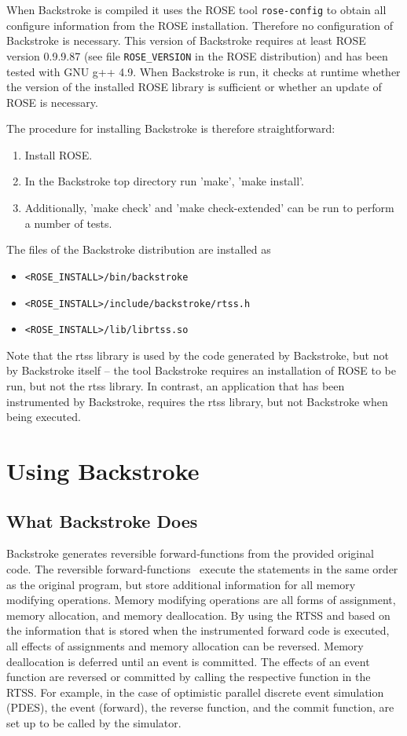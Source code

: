 \documentclass[english,12pt, titlepage]{article}      %
\newcommand{\forwardfunctions}{forward-functions}
\begin{document}
When Backstroke is compiled it uses the ROSE tool \verb+rose-config+
to obtain all configure information from the ROSE
installation. Therefore no configuration of Backstroke is necessary.
This version of Backstroke requires at least ROSE version 0.9.9.87 (see
file \verb+ROSE_VERSION+ in the ROSE distribution) and has been tested
with GNU g++ 4.9. When Backstroke is run, it checks at runtime whether the
version of the installed ROSE library is sufficient or whether an
update of ROSE is necessary.

The procedure for installing Backstroke is therefore straightforward:
\begin{enumerate}
\item Install ROSE.
\item In the Backstroke top directory run 'make', 'make install'.
\item Additionally, 'make check' and 'make check-extended' can be run to perform a number of tests.
\end{enumerate}

The files of the Backstroke distribution are installed as

\begin{itemize}
\item \verb+<ROSE_INSTALL>/bin/backstroke+
\item \verb+<ROSE_INSTALL>/include/backstroke/rtss.h+
\item \verb+<ROSE_INSTALL>/lib/librtss.so+
\end{itemize}

Note that the rtss library is used by the code generated by
Backstroke, but not by Backstroke itself -- the tool Backstroke
requires an installation of ROSE to be run, but not the rtss
library. In contrast, an application that has been instrumented by
Backstroke, requires the rtss library, but not Backstroke when being
executed.

\section{Using Backstroke}

\subsection{What Backstroke Does}

Backstroke generates reversible \forwardfunctions{} from the provided
original code. The reversible \forwardfunctions~ execute the statements in the
same order as the original program, but store additional information
for all memory modifying operations. Memory modifying operations are
all forms of assignment, memory allocation, and memory
deallocation. By using the RTSS and based on the information that is
stored when the instrumented forward code is executed, all effects of
assignments and memory allocation can be reversed. Memory deallocation
is deferred until an event is committed. The effects of an event
function are reversed or committed by calling the respective function
in the RTSS. For example, in the case of optimistic parallel discrete
event simulation (PDES), the event (forward), the reverse function,
and the commit function, are set up to be called by the simulator.
\end{document}
